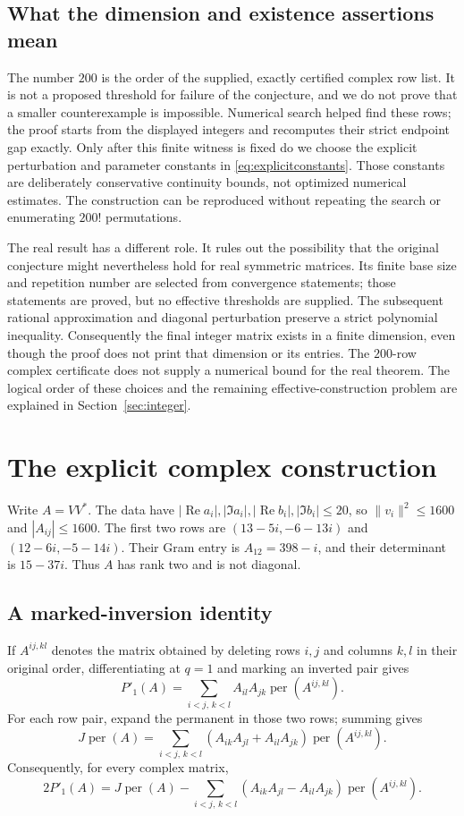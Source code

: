\documentclass[11pt]{article}
\theoremstyle{remark}
\DeclareMathOperator{\per}{per}
\DeclareMathOperator{\Rea}{Re}
\begin{document}
\subsection{What the dimension and existence assertions mean}
The number $200$ is the order of the supplied, exactly certified complex
row list. It is not a proposed threshold for failure of the conjecture,
and we do not prove that a smaller counterexample is impossible.
Numerical search helped find these rows; the proof starts from the
displayed integers and recomputes their strict endpoint gap exactly.
Only after this finite witness is fixed do we choose the explicit
perturbation and parameter constants in \eqref{eq:explicitconstants}.
Those constants are deliberately conservative continuity bounds, not
optimized numerical estimates. The construction can be reproduced
without repeating the search or enumerating $200!$ permutations.

The real result has a different role. It rules out the possibility that
the original conjecture might nevertheless hold for real symmetric
matrices. Its finite base size and repetition number are selected from
convergence statements; those statements are proved, but no effective
thresholds are supplied. The subsequent rational approximation and
diagonal perturbation preserve a strict polynomial inequality.
Consequently the final integer matrix exists in a finite dimension,
even though the proof does not print that dimension or its entries.
The $200$-row complex certificate does not supply a numerical bound for
the real theorem. The logical order of these choices and the remaining
effective-construction problem are explained in Section~\ref{sec:integer}.

\section{The explicit complex construction}\label{sec:explicit}
Write $A=VV^*$. The data have $|\Rea a_i|,|\Im a_i|,
|\Rea b_i|,|\Im b_i|\le20$, so $\|v_i\|^2\le1600$ and
$|A_{ij}|\le1600$. The first two rows are
$(13-5i,-6-13i)$ and $(12-6i,-5-14i)$. Their Gram entry is
$A_{12}=398-i$, and their determinant is $15-37i$. Thus $A$ has
rank two and is not diagonal.

\subsection{A marked-inversion identity}
If $A^{ij,kl}$ denotes the matrix obtained by deleting rows $i,j$
and columns $k,l$ in their original order, differentiating at $q=1$
and marking an inverted pair gives
\begin{equation}\label{eq:complexendpoint}
 P'_1(A)=\sum_{i<j,\,k<l} A_{il}A_{jk}\per(A^{ij,kl}).
\end{equation}
For each row pair, expand the permanent in those two rows; summing gives
\[
 J\per(A)=\sum_{i<j,\,k<l}(A_{ik}A_{jl}+A_{il}A_{jk})\per(A^{ij,kl}).
\]
Consequently, for every complex matrix,
\begin{equation}\label{eq:complexmarked}
 2P'_1(A)=J\per(A)-\sum_{i<j,\,k<l}
 (A_{ik}A_{jl}-A_{il}A_{jk})\per(A^{ij,kl}).
\end{equation}
\end{document}
